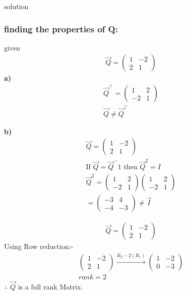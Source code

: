 \documentclass{beamer}
\begin{document}
\begin{frame}{solution}
    \frametitle{finding the properties of Q:}
    given
    \begin{align}
    \vec{Q}=\begin{pmatrix}
        1&-2\\2&1
    \end{pmatrix}
    \end{align}
 \textbf{a)}
    \begin{align}\vec{Q}^\top = \begin{pmatrix} 1 & 2 \\ -2 & 1 \end{pmatrix}\\
    \vec{Q} \neq \vec{Q}^\top
    \end{align}
\end{frame}
\begin{frame}
    \textbf{b)}
    \begin{align}
    \vec{Q}= \begin{pmatrix} 1 & -2 \\ 2 & 1 \end{pmatrix}\\
    \text{If } \vec{Q} = \vec{Q}^-1 \text{ then } \vec{Q}^2 = I\\
    \vec{Q}^2 = \begin{pmatrix} 1 & 2 \\ -2 & 1 \end{pmatrix} \begin{pmatrix} 1 & 2 \\ -2 & 1 \end{pmatrix}\\
    = \begin{pmatrix} -3 & 4 \\ -4 & -3 \end{pmatrix}
    \neq \vec{I}
    \end{align}
    \end{frame}
    \begin{frame}
\begin{align}
\vec{Q}= \begin{pmatrix} 1 & -2 \\ 2 & 1 \end{pmatrix}
\end{align}
    Using Row reduction:-
\begin{align}
\begin{pmatrix} 1 & -2 \\ 2 & 1 \end{pmatrix}\xrightarrow{R_2-2(R_1)}
\begin{pmatrix} 1 & -2 \\ 0 & -3
\end{pmatrix}\\
rank=2
\end{align}
$\therefore$ $\vec{Q}$ is a full rank Matrix.
\end{frame}
\end{document}
